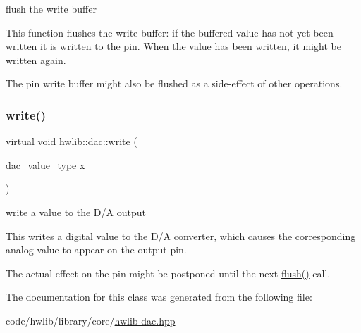 flush the write buffer

This function flushes the write buffer\+: if the buffered value has not yet been written it is written to the pin. When the value has been written, it might be written again.

The pin write buffer might also be flushed as a side-\/effect of other operations. \mbox{\label{classhwlib_1_1dac_ac1572029354d3334b053b4d4966b7208}} 
\subsubsection{\texorpdfstring{write()}{write()}}
{\footnotesize\ttfamily virtual void hwlib\+::dac\+::write (\begin{DoxyParamCaption}\item[{\hyperlink{classhwlib_1_1dac_a817d363b6abcd056bce2f0a4a514cb14}{dac\+\_\+value\+\_\+type}}]{x }\end{DoxyParamCaption})\hspace{0.3cm}{\ttfamily [pure virtual]}}

write a value to the D/A output

This writes a digital value to the D/A converter, which causes the corresponding analog value to appear on the output pin.

The actual effect on the pin might be postponed until the next \hyperlink{classhwlib_1_1dac_ab25a6ae2d86b0bec3afdecf3d22faf67}{flush()} call. 

The documentation for this class was generated from the following file\+:\begin{DoxyCompactItemize}
\item 
code/hwlib/library/core/\hyperlink{hwlib-dac_8hpp}{hwlib-\/dac.\+hpp}\end{DoxyCompactItemize}
